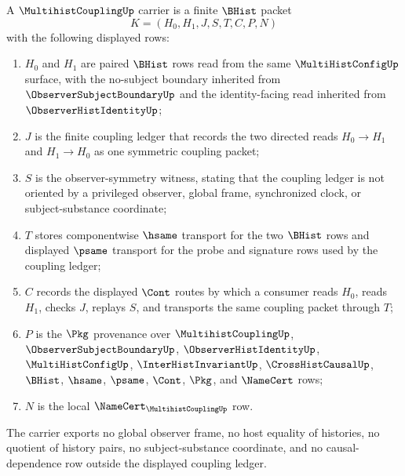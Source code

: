 \begin{definition}
\label{def:multihist-coupling-carrier}
A $\MultihistCouplingUp$ carrier is a finite $\BHist$ packet
$$
K=(H_0,H_1,J,S,T,C,P,N)
$$
with the following displayed rows:
\begin{enumerate}
\item $H_0$ and $H_1$ are paired $\BHist$ rows read from the same $\MultiHistConfigUp$ surface, with the no-subject boundary inherited from $\ObserverSubjectBoundaryUp$ and the identity-facing read inherited from $\ObserverHistIdentityUp$;
\item $J$ is the finite coupling ledger that records the two directed reads $H_0 \to H_1$ and $H_1 \to H_0$ as one symmetric coupling packet;
\item $S$ is the observer-symmetry witness, stating that the coupling ledger is not oriented by a privileged observer, global frame, synchronized clock, or subject-substance coordinate;
\item $T$ stores componentwise $\hsame$ transport for the two $\BHist$ rows and displayed $\psame$ transport for the probe and signature rows used by the coupling ledger;
\item $C$ records the displayed $\Cont$ routes by which a consumer reads $H_0$, reads $H_1$, checks $J$, replays $S$, and transports the same coupling packet through $T$;
\item $P$ is the $\Pkg$ provenance over $\MultihistCouplingUp$, $\ObserverSubjectBoundaryUp$, $\ObserverHistIdentityUp$, $\MultiHistConfigUp$, $\InterHistInvariantUp$, $\CrossHistCausalUp$, $\BHist$, $\hsame$, $\psame$, $\Cont$, $\Pkg$, and $\NameCert$ rows;
\item $N$ is the local $\NameCert_{\MultihistCouplingUp}$ row.
\end{enumerate}
The carrier exports no global observer frame, no host equality of histories, no quotient of history pairs, no subject-substance coordinate, and no causal-dependence row outside the displayed coupling ledger.
\end{definition}

